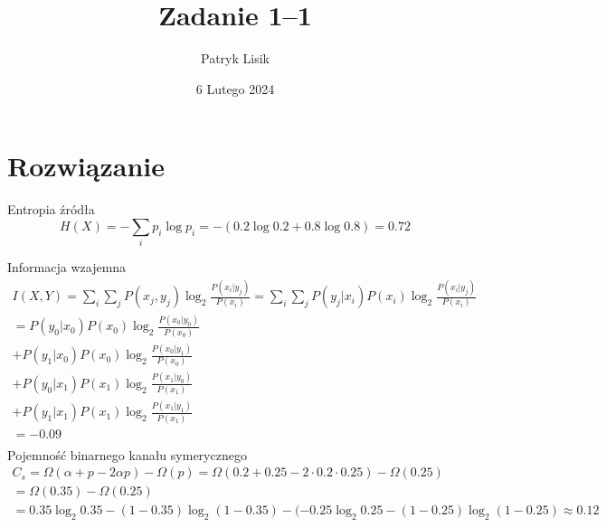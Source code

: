 \documentclass[12pt]{article}
\title{Zadanie 1--1}
\author{Patryk Lisik}
\date{\(6\) Lutego  2024}
\begin{document}
    \maketitle
    \renewcommand{\abstractname}{Treść}



    \section*{Rozwiązanie}

    Entropia źródła
    \begin{equation*}
        H(X) = -\sum_i p_i \log p_i = -(0.2 \log 0.2 + 0.8 \log 0.8) = 0.72
    \end{equation*}

    Informacja wzajemna
    \begin{multline*}
        I(X,Y)  = \sum_{i}\sum_j P(x_j,y_j)\log_2 \frac{P(x_i|y_j)}{P(x_i)}
        = \sum_{i}\sum_j P(y_j|x_i)P(x_i)\log_2 \frac{P(x_i|y_j)}{P(x_i)} \\
        = P(y_0|x_0)P(x_0)\log_2 \frac{P(x_0|y_0)}{P(x_0)} \\
        + P(y_1|x_0)P(x_0)\log_2 \frac{P(x_0|y_1)}{P(x_0)} \\
        + P(y_0|x_1)P(x_1)\log_2 \frac{P(x_1|y_0)}{P(x_1)} \\
        + P(y_1|x_1)P(x_1)\log_2 \frac{P(x_1|y_1)}{P(x_1)} \\
        =  -0.09 \\
    \end{multline*}
Pojemność binarnego kanału symerycznego
    \begin{multline*}
    C_s = \Omega(\alpha + p - 2\alpha p) - \Omega (p) = \Omega(0.2+0.25 - 2 \cdot 0.2 \cdot 0.25)-\Omega(0.25) \\
        = \Omega(0.35)-\Omega(0.25) \\
        = 0.35 \log_2 0.35 - (1-0.35) \log_2(1-0.35) -(-0.25\log_2 0.25 - (1-0.25)\log_2(1-0.25) \approx 0.12 
\end{multline*}
    
\end{document}
